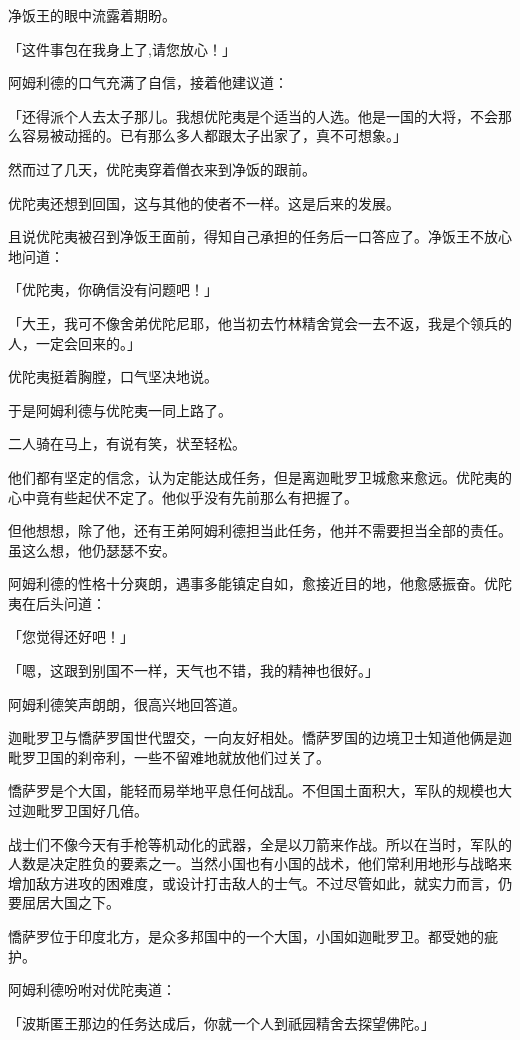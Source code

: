 \documentclass[twoside,openany]{book}
\begin{document}
净饭王的眼中流露着期盼。

「这件事包在我身上了,请您放心！」

阿姆利德的口气充满了自信，接着他建议道：

「还得派个人去太子那儿。我想优陀夷是个适当的人选。他是一国的大将，不会那么容易被动摇的。已有那么多人都跟太子出家了，真不可想象。」

然而过了几天，优陀夷穿着僧衣来到净饭的跟前。

优陀夷还想到回国，这与其他的使者不一样。这是后来的发展。

且说优陀夷被召到净饭王面前，得知自己承担的任务后一口答应了。净饭王不放心地问道：

「优陀夷，你确信没有问题吧！」

「大王，我可不像舍弟优陀尼耶，他当初去竹林精舍覚会一去不返，我是个领兵的人，一定会回来的。」

优陀夷挺着胸膛，口气坚决地说。

于是阿姆利德与优陀夷一同上路了。

二人骑在马上，有说有笑，状至轻松。

他们都有坚定的信念，认为定能达成任务，但是离迦毗罗卫城愈来愈远。优陀夷的心中竟有些起伏不定了。他似乎没有先前那么有把握了。

但他想想，除了他，还有王弟阿姆利德担当此任务，他并不需要担当全部的责任。虽这么想，他仍瑟瑟不安。

阿姆利德的性格十分爽朗，遇事多能镇定自如，愈接近目的地，他愈感振奋。优陀夷在后头问道：

「您觉得还好吧！」

「嗯，这跟到别国不一样，天气也不错，我的精神也很好。」

阿姆利德笑声朗朗，很高兴地回答道。

迦毗罗卫与憍萨罗国世代盟交，一向友好相处。憍萨罗国的边境卫士知道他俩是迦毗罗卫国的刹帝利，一些不留难地就放他们过关了。

憍萨罗是个大国，能轻而易举地平息任何战乱。不但国土面积大，军队的规模也大过迦毗罗卫国好几倍。

战士们不像今天有手枪等机动化的武器，全是以刀箭来作战。所以在当时，军队的人数是决定胜负的要素之一。当然小国也有小国的战术，他们常利用地形与战略来增加敌方进攻的困难度，或设计打击敌人的士气。不过尽管如此，就实力而言，仍要屈居大国之下。

憍萨罗位于印度北方，是众多邦国中的一个大国，小国如迦毗罗卫。都受她的疵护。

阿姆利德吩咐对优陀夷道：

「波斯匿王那边的任务达成后，你就一个人到祇园精舍去探望佛陀。」
\end{document}

